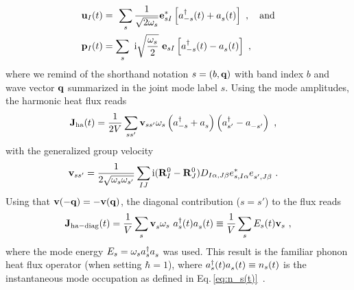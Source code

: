 \begin{align}
    \b u_I (t) 
	    &= ~\sum_s \frac{1}{\sqrt{2 \omega_s}} \b e^\ast_{s I} \left[ \D a_{-s} (t) + \fD a_s (t)\right]~,\quad\text{and} \\
	  \b p_I (t) 
		  &= \sum_s ~\im \sqrt{\frac{\omega_s}{2}} ~ {\b e}_{s I} \left[ \D a_{-s} (t) - \fD a_s (t) \right]~,
\end{align}
where we remind of the shorthand notation $s = (b, {\bf q})$ with band index $b$ and wave vector $\bf q$ summarized in the joint mode label $s$. Using the mode amplitudes, the harmonic heat flux reads
\begin{align}
    \b J_{\rm ha} (t) 
	    &= \frac{1}{2V} \sum_{ss'} \b v_{ss'} \omega_{s} \left( \D a_{-s} + \fD a_{s}  \right) \left( \D a_{s'} - \fD a_{-s'}  \right)~,
	  \label{eq:J.ha}
\end{align}
with the generalized group velocity
\begin{align}
	\b v_{ss'}
		&= \frac{1}{2 \sqrt{\omega_s \omega_{s'}}} \sum_{IJ} \im (\b R^0_I - \b R^0_J) D_{I \alpha, J \beta} e^\ast_{s, I \alpha} \fD e_{s', J \beta}~.
\end{align}
Using that ${\bf v} (- {\bf q}) = - {\bf v} ({\bf q})$, %
the diagonal contribution ($s=s'$) to the flux reads
\begin{align}
	\b J_{\rm ha-diag} (t) 
		= \frac{1}{V} \sum_{s} \fD {\b v}_{s} \omega_{s} ~ \D a_s (t) \fD a_s (t)
		\equiv \frac{1}{V} \sum_{s} E_s (t)  {\bf v}_{s}~,
	\label{eq:J.ha.diag}
\end{align}
where the mode energy $E_s = \omega_s \D a_s \fD a_s$ was used.
This result is the familiar phonon heat flux operator (when setting $\hbar = 1$), where $\D a_s (t) \fD a_s (t) \equiv n_s(t)$ is the instantaneous mode occupation as defined in Eq.\,\eqref{eq:n_s(t)}~\cite{Peierls1929,Hardy1963,Isaeva2019}.

